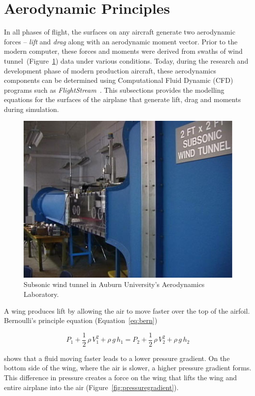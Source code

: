 \section{\textbf{Aerodynamic Principles}}\label{section:aerodynamic}
In all phases of flight, the surfaces on any aircraft generate two aerodynamic forces {--} \textit{lift} and \textit{drag} along with an aerodynamic moment vector. Prior to the modern computer, these forces and moments were derived from swaths of wind tunnel~(Figure~\ref{fig:windtunnel}) data under various conditions. Today, during the research and development phase of modern production aircraft, these aerodynamics components can be determined using Computational Fluid Dynamic (CFD) programs such as \textit{FlightStream}~\cite{FlightStream2022}. This subsections provides the modelling equations for the surfaces of the airplane that generate lift, drag and moments during simulation.

\begin{figure}[!ht]\label{fig:windtunnel}
    \centering
    \includegraphics[width=.75\linewidth]{Figures/opencircuitwindtunnel.jpg}
    \caption{Subsonic wind tunnel in Auburn University's Aerodynamics Laboratory.}
\end{figure}


A wing produces lift by allowing the air to move faster over the top of the airfoil. Bernoulli's principle equation (Equation~\ref{eq:bern})

\begin{equation}\label{eq:bern}
    P_1 + \frac{1}{2}\, \rho \, V_1^2 + \rho \, g \, h_1 = P_2 + \frac{1}{2}\, \rho \, V_2^2 + \rho \, g \, h_2
\end{equation}

shows that a fluid moving faster leads to a lower pressure gradient. On the bottom side of the wing, where the air is slower, a higher pressure gradient forms. This difference in pressure creates a force on the wing that lifts the wing and entire airplane into the air (Figure~\ref{fig:pressuregradient}).

